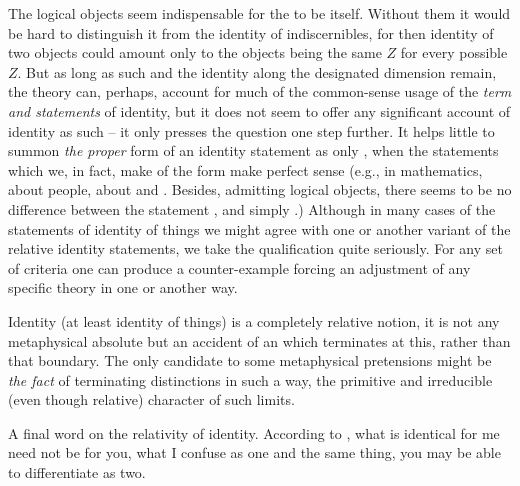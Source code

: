 The logical objects seem indispensable for the  to
be itself. Without them it would be hard to distinguish it from the identity of
indiscernibles, for then identity of two objects could amount only to the
objects being the same $Z$ for every possible $Z$.  But as long as such
 and the identity along the designated
dimension remain, the theory can, perhaps, account for much of the common-sense
usage of the {\em term and statements} of identity, but it does not seem to
offer any significant account of identity as such -- it only presses the
question one step further.  It helps little to summon {\em the proper} form of
an identity statement as only , when the
statements which we, in fact, make of the form  make
perfect sense (e.g., in mathematics, about people, about  and
.  Besides, admitting logical objects, there seems to be no
difference between the statement ,
 and simply .)
Although in many cases of the statements of identity of things we might agree
with one or another variant of the relative identity statements, we take the
qualification  quite seriously. For any set of criteria one
can produce a counter-example forcing an adjustment of any specific theory in
one or another way.

Identity (at least identity of  things) is a completely relative
notion, it is not any metaphysical absolute but an accident of an 
which
terminates  at this, rather than that boundary. %
The only candidate to some metaphysical pretensions might be {\em the fact} of
terminating distinctions in such a way, the primitive and irreducible (even
though relative) character of such limits. 

\pa A final word on the relativity of identity. According to
, what is identical for me need not be for you, what I confuse
as one and the same thing, you may be able to differentiate as two.

